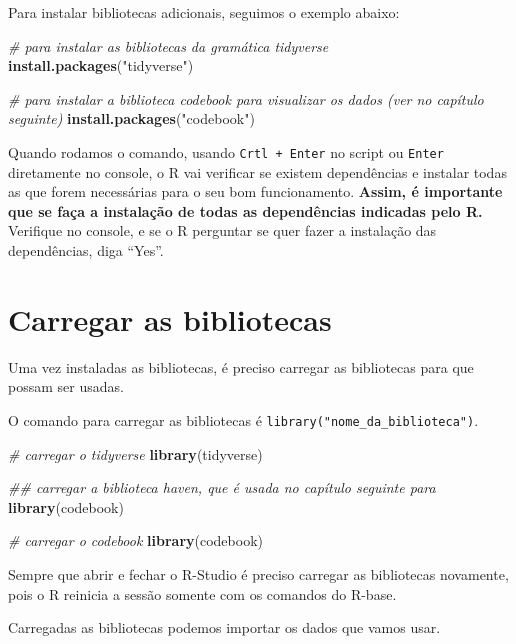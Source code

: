 \documentclass[
  brazil,
]{book}
\newenvironment{Shaded}{\begin{snugshade}}{\end{snugshade}}
\newcommand{\CommentTok}[1]{\textcolor[rgb]{0.56,0.35,0.01}{\textit{#1}}}
\newcommand{\KeywordTok}[1]{\textcolor[rgb]{0.13,0.29,0.53}{\textbf{#1}}}
\newcommand{\NormalTok}[1]{#1}
\newcommand{\StringTok}[1]{\textcolor[rgb]{0.31,0.60,0.02}{#1}}
\begin{document}
Para instalar bibliotecas adicionais, seguimos o exemplo abaixo:

\begin{Shaded}
\begin{Highlighting}[]
\CommentTok{# para instalar as bibliotecas da gramática tidyverse}
\KeywordTok{install.packages}\NormalTok{(}\StringTok{"tidyverse"}\NormalTok{)}

\CommentTok{# para instalar a biblioteca codebook para visualizar os dados (ver no capítulo seguinte)}
\KeywordTok{install.packages}\NormalTok{(}\StringTok{"codebook"}\NormalTok{)}
\end{Highlighting}
\end{Shaded}

Quando rodamos o comando, usando \texttt{Crtl\ +\ Enter} no script ou \texttt{Enter} diretamente no console, o R vai verificar se existem dependências e instalar todas as que forem necessárias para o seu bom funcionamento. \textbf{Assim, é importante que se faça a instalação de todas as dependências indicadas pelo R.} Verifique no console, e se o R perguntar se quer fazer a instalação das dependências, diga ``Yes''.

\hypertarget{carregar-as-bibliotecas}{%
\section{Carregar as bibliotecas}\label{carregar-as-bibliotecas}}

Uma vez instaladas as bibliotecas, é preciso carregar as bibliotecas para que possam ser usadas.

O comando para carregar as bibliotecas é \texttt{library("nome\_da\_biblioteca")}.

\begin{Shaded}
\begin{Highlighting}[]
\CommentTok{# carregar o tidyverse}
\KeywordTok{library}\NormalTok{(tidyverse)}

\CommentTok{## carregar a biblioteca haven, que é usada no capítulo seguinte para }
\KeywordTok{library}\NormalTok{(codebook)}

\CommentTok{# carregar o codebook}
\KeywordTok{library}\NormalTok{(codebook)}
\end{Highlighting}
\end{Shaded}

Sempre que abrir e fechar o R-Studio é preciso carregar as bibliotecas novamente, pois o R reinicia a sessão somente com os comandos do R-base.

Carregadas as bibliotecas podemos importar os dados que vamos usar.
\end{document}

